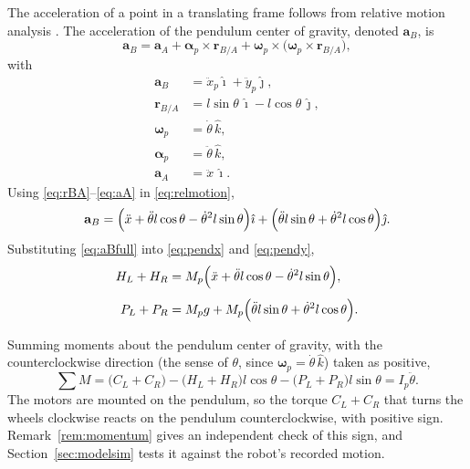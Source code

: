 The acceleration of a point in a translating frame follows from relative motion
analysis \cite{hibbeler2010dynamics}. The acceleration of the pendulum center of
gravity, denoted $\mathbf{a}_B$, is
\begin{equation}\label{eq:relmotion}
\mathbf{a}_B=\mathbf{a}_A
+\bm{\alpha}_p\times\mathbf{r}_{B/A}
+\bm{\omega}_p\times\bigl(\bm{\omega}_p\times\mathbf{r}_{B/A}\bigr),
\end{equation}
with
\begin{align}
\mathbf{a}_B&=\ddot x_p\hat\imath+\ddot y_p\hat\jmath ,\label{eq:aB}\\
\mathbf{r}_{B/A}&=l\sin\theta\,\hat\imath-l\cos\theta\,\hat\jmath ,\label{eq:rBA}\\
\bm{\omega}_p&=\dot\theta\,\hat k ,\label{eq:omegap}\\
\bm{\alpha}_p&=\ddot\theta\,\hat k ,\label{eq:alphap}\\
\mathbf{a}_A&=\ddot x\,\hat\imath .\label{eq:aA}
\end{align}
Using \eqref{eq:rBA}--\eqref{eq:aA} in \eqref{eq:relmotion},
\begin{equation}\label{eq:aBfull}
\mathbf{a}_B=\Bigl(\ddot x+\ddot\theta l\cos\theta-\dot\theta^2l\sin\theta\Bigr)\hat\imath
+\Bigl(\ddot\theta l\sin\theta+\dot\theta^2l\cos\theta\Bigr)\hat\jmath .
\end{equation}
Substituting \eqref{eq:aBfull} into \eqref{eq:pendx} and \eqref{eq:pendy},
\begin{align}
H_L+H_R&=M_p\Bigl(\ddot x+\ddot\theta l\cos\theta-\dot\theta^2l\sin\theta\Bigr),
\label{eq:Hsum}\\[4pt]
P_L+P_R&=M_pg+M_p\Bigl(\ddot\theta l\sin\theta+\dot\theta^2l\cos\theta\Bigr).
\label{eq:Psum}
\end{align}

Summing moments about the pendulum center of gravity, with the
counterclockwise direction (the sense of $\theta$, since
$\bm{\omega}_p=\dot\theta\,\hat k$) taken as positive,
\begin{equation}\label{eq:pendm}
\sum M=\bigl(C_L+C_R\bigr)-\bigl(H_L+H_R\bigr)l\cos\theta
-\bigl(P_L+P_R\bigr)l\sin\theta=I_p\ddot\theta .
\end{equation}
The motors are mounted on the pendulum, so the torque $C_L+C_R$ that turns the
wheels clockwise reacts on the pendulum counterclockwise, with positive sign.
Remark~\ref{rem:momentum} gives an independent check of this sign, and
Section~\ref{sec:modelsim} tests it against the robot's recorded motion.

